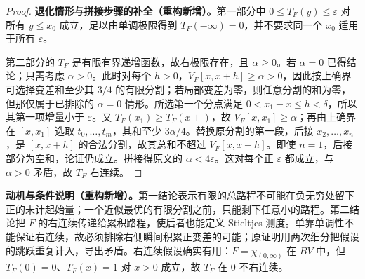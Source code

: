 \documentclass[../../main.tex]{subfiles}%
\begin{document}
\begin{proof}
\textbf{退化情形与拼接步骤的补全（重构新增）。}第一部分中 $0\le T_F(y)\le\varepsilon$ 对所有 $y\le x_0$ 成立，足以由单调极限得到 $T_F(-\infty)=0$，并不要求同一个 $x_0$ 适用于所有 $\varepsilon$。

第二部分的 $T_F$ 是有限有界递增函数，故右极限存在，且 $\alpha\ge0$。若 $\alpha=0$ 已得结论；只需考虑 $\alpha>0$。此时对每个 $h>0$，$V_F[x,x+h]\ge\alpha>0$，因此按上确界可选择变差和至少其 $3/4$ 的有限分割；若局部变差为零，则任意分割的和为零，但那仅属于已排除的 $\alpha=0$ 情形。所选第一个分点满足 $0<x_1-x\le h<\delta$，所以其第一项增量小于 $\varepsilon$。又 $T_F(x_1)\ge T_F(x+)$，故 $V_F[x,x_1]\ge\alpha$；再由上确界在 $[x,x_1]$ 选取 $t_0,\ldots,t_m$，其和至少 $3\alpha/4$。替换原分割的第一段，后接 $x_2,\ldots,x_n$，是 $[x,x+h]$ 的合法分割，故其总和不超过 $V_F[x,x+h]$。即使 $n=1$，后接部分为空和，论证仍成立。拼接得原文的 $\alpha<4\varepsilon$。这对每个正 $\varepsilon$ 都成立，与 $\alpha>0$ 矛盾，故 $T_F$ 右连续。
\end{proof}
\begin{remark}
\textbf{动机与条件说明（重构新增）。}第一结论表示有限的总路程不可能在负无穷处留下正的未计起始量；一个近似最优的有限分割之前，只能剩下任意小的路程。第二结论把 $F$ 的右连续传递给累积路程，使后者也能定义 Stieltjes 测度。单靠单调性不能保证右连续，故必须排除右侧瞬间积累正变差的可能；原证明用两次细分把假设的跳跃重复计入，导出矛盾。右连续假设确实有用：$F=\chi_{(0,\infty)}$ 在 $BV$ 中，但 $T_F(0)=0$、$T_F(x)=1$ 对 $x>0$ 成立，故 $T_F$ 在 $0$ 不右连续。
\end{remark}
\end{document}
